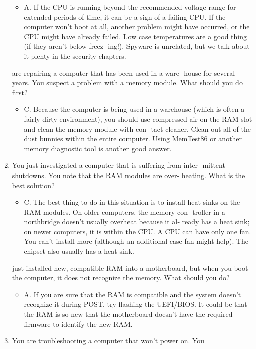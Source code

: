 \documentclass{article}
\begin{document}
\begin{enumerate}
    \begin{itemize}
        \item A. If the CPU is running beyond the recommended voltage
range for extended periods of time, it can be a sign of a failing
CPU. If the computer won’t boot at all, another problem might
have occurred, or the CPU might have already failed. Low
case temperatures are a good thing (if they aren’t below freez‐
ing!). Spyware is unrelated, but we talk about it plenty in the
security chapters.
    \end{itemize}
    \itemYou are repairing a computer that has been used in a ware‐
house for several years. You suspect a problem with a memory
module. What should you do first?
    \begin{itemize}
        \item C. Because the computer is being used in a warehouse (which
is often a fairly dirty environment), you should use compressed
air on the RAM slot and clean the memory module with con‐
tact cleaner. Clean out all of the dust bunnies within the entire
computer. Using MemTest86 or another memory diagnostic
tool is another good answer.
    \end{itemize}
    \item You just investigated a computer that is suffering from inter‐
mittent shutdowns. You note that the RAM modules are over‐
heating. What is the best solution?
    \begin{itemize}
        \item C. The best thing to do in this situation is to install heat sinks
on the RAM modules. On older computers, the memory con‐
troller in a northbridge doesn’t usually overheat because it al‐
ready has a heat sink; on newer computers, it is within the
CPU. A CPU can have only one fan. You can’t install more
(although an additional case fan might help). The chipset also
usually has a heat sink.
    \end{itemize}
    \itemYou just installed new, compatible RAM into a motherboard,
but when you boot the computer, it does not recognize the
memory. What should you do?
    \begin{itemize}
        \item A. If you are sure that the RAM is compatible and the system doesn’t recognize it during POST, try flashing the UEFI/BIOS.
It could be that the RAM is so new that the motherboard
doesn’t have the required firmware to identify the new RAM.
    \end{itemize}
    \item You are troubleshooting a computer that won’t power on. You

\end{enumerate}
\end{document}
